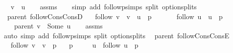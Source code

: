 \begin{isabellebody}
\ \ \ {\isachardoublequoteopen}v\ {\isacharequal}{\kern0pt}\ u{\isachardoublequoteclose}\isanewline
%
\isadelimproof
\ \ %
\endisadelimproof
%
\isatagproof
{}\isamarkupfalse%
\ assms\isanewline
\ \ \isamarkupfalse%
\ {\isacharparenleft}{\kern0pt}simp\ add{\isacharcolon}{\kern0pt}\ follow{\isacharunderscore}{\kern0pt}psimps\ split{\isacharcolon}{\kern0pt}\ option{\isachardot}{\kern0pt}splits{\isacharparenleft}{\kern0pt}{}{\isacharparenright}{\kern0pt}{\isacharparenright}{\kern0pt}%
\endisatagproof
{\isafoldproof}%
%
\isadelimproof
\isanewline
%
\endisadelimproof
\isanewline
{}\isamarkupfalse%
\ {\isacharparenleft}{\kern0pt}\ parent{\isacharparenright}{\kern0pt}\ follow{\isacharunderscore}{\kern0pt}Cons{\isacharunderscore}{\kern0pt}ConsD{\isacharcolon}{\kern0pt}\isanewline
\ \ \ {\isachardoublequoteopen}follow\ v\ {\isacharequal}{\kern0pt}\ v\ {\isacharhash}{\kern0pt}\ u\ {\isacharhash}{\kern0pt}\ p{\isachardoublequoteclose}\isanewline
\ \ \isanewline
\ \ \ \ {\isachardoublequoteopen}follow\ u\ {\isacharequal}{\kern0pt}\ u\ {\isacharhash}{\kern0pt}\ p{\isachardoublequoteclose}\isanewline
\ \ \ \ {\isachardoublequoteopen}parent\ v\ {\isacharequal}{\kern0pt}\ Some\ u{\isachardoublequoteclose}\isanewline
%
\isadelimproof
\ \ %
\endisadelimproof
%
\isatagproof
{}\isamarkupfalse%
\ assms\isanewline
\ \ \isamarkupfalse%
\ {\isacharparenleft}{\kern0pt}auto\ simp\ add{\isacharcolon}{\kern0pt}\ follow{\isacharunderscore}{\kern0pt}psimps\ split{\isacharcolon}{\kern0pt}\ option{\isachardot}{\kern0pt}splits{\isacharparenleft}{\kern0pt}{}{\isacharparenright}{\kern0pt}{\isacharparenright}{\kern0pt}%
\endisatagproof
{\isafoldproof}%
%
\isadelimproof
\isanewline
%
\endisadelimproof
\isanewline
{}\isamarkupfalse%
\ {\isacharparenleft}{\kern0pt}\ parent{\isacharparenright}{\kern0pt}\ follow{\isacharunderscore}{\kern0pt}Cons{\isacharunderscore}{\kern0pt}ConsE{\isacharcolon}{\kern0pt}\isanewline
\ \ \ {\isachardoublequoteopen}follow\ v\ {\isacharequal}{\kern0pt}\ v\ {\isacharhash}{\kern0pt}\ p{\isachardoublequoteclose}\isanewline
\ \ \ {\isachardoublequoteopen}p\ {\isasymnoteq}\ {\isacharbrackleft}{\kern0pt}{\isacharbrackright}{\kern0pt}{\isachardoublequoteclose}\isanewline
\ \ \ u\ \ {\isachardoublequoteopen}follow\ u\ {\isacharequal}{\kern0pt}\ p{\isachardoublequoteclose}\isanewline
%
\isadelimproof

\end{isabellebody}
